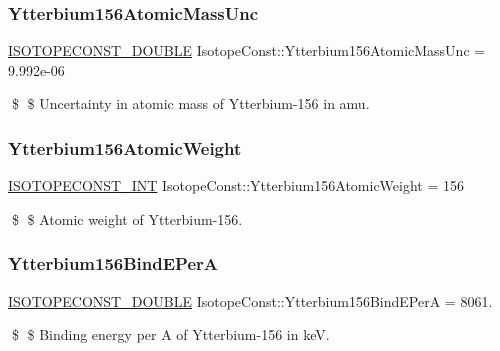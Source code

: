 \subsubsection{\texorpdfstring{Ytterbium156\+Atomic\+Mass\+Unc}{Ytterbium156AtomicMassUnc}}
{\footnotesize\ttfamily \mbox{\hyperlink{group___isotope_const-_macros_ga8f45a7272ce02c0b4c65c44636ed719a}{I\+S\+O\+T\+O\+P\+E\+C\+O\+N\+S\+T\+\_\+\+D\+O\+U\+B\+LE}} Isotope\+Const\+::\+Ytterbium156\+Atomic\+Mass\+Unc = 9.\+992e-\/06}

\$ \$ Uncertainty in atomic mass of Ytterbium-\/156 in amu. \mbox{\label{group___isotope_const-_ytterbium-_yb156_gae0397d7b4ec1ddc3e157e0a34e49f359}} 
\subsubsection{\texorpdfstring{Ytterbium156\+Atomic\+Weight}{Ytterbium156AtomicWeight}}
{\footnotesize\ttfamily \mbox{\hyperlink{group___isotope_const-_macros_ga5f18360b3e99483a35c32d789e62621c}{I\+S\+O\+T\+O\+P\+E\+C\+O\+N\+S\+T\+\_\+\+I\+NT}} Isotope\+Const\+::\+Ytterbium156\+Atomic\+Weight = 156}

\$ \$ Atomic weight of Ytterbium-\/156. \mbox{\label{group___isotope_const-_ytterbium-_yb156_ga24c90c15ecb4c74fd2cd6bad4f481050}} 
\subsubsection{\texorpdfstring{Ytterbium156\+Bind\+E\+PerA}{Ytterbium156BindEPerA}}
{\footnotesize\ttfamily \mbox{\hyperlink{group___isotope_const-_macros_ga8f45a7272ce02c0b4c65c44636ed719a}{I\+S\+O\+T\+O\+P\+E\+C\+O\+N\+S\+T\+\_\+\+D\+O\+U\+B\+LE}} Isotope\+Const\+::\+Ytterbium156\+Bind\+E\+PerA = 8061.}

\$ \$ Binding energy per A of Ytterbium-\/156 in keV. \mbox{\label{group___isotope_const-_ytterbium-_yb156_ga4749a8f91ea37d23411ae5c5e813c375}} 
